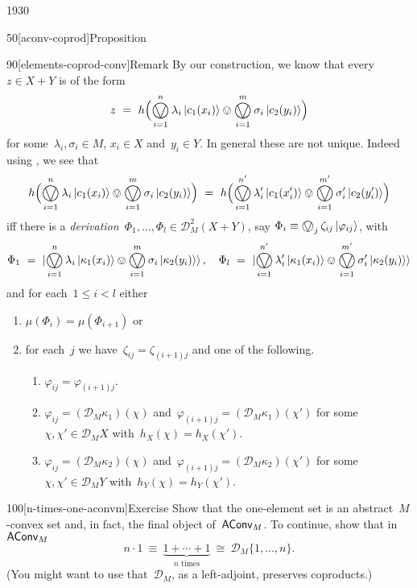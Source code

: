 \begin{parsec}{1930}
\begin{point}{50}[aconv-coprod]{Proposition}
\begin{point}{90}[elements-coprod-conv]{Remark}
By our construction, we know that
    every~$z \in X+Y$
    is of the
    form
\begin{equation*}
    z \ =\  h 
    \Bigl( \bigovee^n_{i=1} \lambda_i \ket{c_1(x_i)}
    \ovee \bigovee^m_{i=1} \sigma_i \ket{c_2(y_i)} \Bigr)
\end{equation*}
for some~$\lambda_i,\sigma_i \in M $, 
$x_i \in X$ and~$y_i \in Y$.
In general these are not unique.
Indeed
using , we see that
\begin{equation*}
     h 
     \Bigl( \bigovee^n_{i=1} \lambda_i \ket{c_1(x_i)}
     \ovee \bigovee^m_{i=1} \sigma_i \ket{c_2(y_i)} \Bigr) 
     \ = \ 
     h 
     \Bigl( \bigovee^{n'}_{i=1} \lambda'_i \ket{c_1(x'_i)}
     \ovee \bigovee^{m'}_{i=1} \sigma'_i \ket{c_2(y'_i)} \Bigr)
\end{equation*}
iff there is a \emph{derivation}~$\Phi_1, \ldots, \Phi_l \in \mathcal{D}^2_M(X+Y)$,
say $\Phi_i \equiv \bigovee_j \zeta_{ij} \ket{\varphi_{ij}}$,
with
\begin{equation*}
\Phi_1 \ =\  
\ket {\bigovee^n_{i=1} \lambda_i \ket{\kappa_1(x_i)}
\ovee \bigovee^m_{i=1} \sigma_i \ket{\kappa_2(y_i)}}
, \quad
 \Phi_l \ =\  
 \ket {\bigovee^{n'}_{i=1} \lambda'_i \ket{\kappa_1(x_i)}
 \ovee \bigovee^{m'}_{i=1} \sigma'_i \ket{\kappa_2(y_i)}}
\end{equation*}
and for each~$1 \leq i < l$ either
\begin{enumerate}
    \item $\mu(\Phi_i) = \mu(\Phi_{i+1})$
        or
    \item
        for each~$j$ we have~$\zeta_{ij} = \zeta_{(i+1)j}$
        and one of the following.
        \begin{enumerate}
        \item
    $\varphi_{ij} = \varphi_{(i+1)j}$.
\item
    $\varphi_{ij} = (\mathcal{D}_M\kappa_1) (\chi)$
and~$\varphi_{(i+1)j} = (\mathcal{D}_M\kappa_1) (\chi')$
        for some~$\chi,\chi' \in \mathcal{D}_M X$
        with~$h_X( \chi) = h_X(\chi')$.
\item
    $\varphi_{ij} = (\mathcal{D}_M\kappa_2) (\chi)$
and~$\varphi_{(i+1)j} = (\mathcal{D}_M\kappa_2) (\chi')$
        for some~$\chi,\chi' \in \mathcal{D}_M Y$
        with~$h_Y( \chi) = h_Y(\chi')$.
        \end{enumerate}
\end{enumerate}
\end{point}
\end{point}
\begin{point}{100}[n-times-one-aconvm]{Exercise}%
Show that the one-element set is an abstract~$M$-convex set
    and, in fact, the final object of~$\mathsf{AConv}_M$.
To continue, show that in~$\mathsf{AConv}_M$
\begin{equation*}
    n \cdot 1 \ \equiv \ \underbrace{1 + \cdots + 1}_{\text{$n$ times}}
    \ \cong \ \mathcal{D}_M \{1, \ldots, n\}.
\end{equation*}
(You might want to use that~$\mathcal{D}_M$, as a left-adjoint,
    preserves coproducts.)
\end{point}
\end{parsec}

